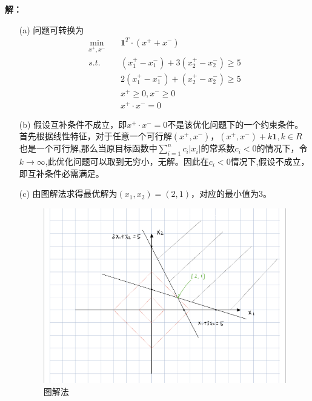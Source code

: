 \documentclass[10pt]{article}
\begin{document}
\begin{enumerate}
	\Large{\textbf{解：}}
	\begin{itemize}
	\item [(a)]问题可转换为
	\begin{equation}
	\begin{aligned}
		\min_{x^+,x^-}\quad &\boldsymbol{1}^T\cdot(x^++x^-)\\
		s.t.\quad            &(x_1^+-x_1^-) + 3(x_2^+-x_2^-) \ge 5\\
							 &2(x_1^+-x_1^-) + (x_2^+-x_2^-) \ge 5\\
							 &x^+\ge0,x^-\ge0\\
							 &x^+\cdot x^-=0
	\end{aligned}
	\end{equation}
	\item [(b)] 假设互补条件不成立，即$x^+\cdot x^-=0$不是该优化问题下的一个约束条件。首先根据线性特征，对于任意一个可行解$(x^+,x^-)$，$(x^+,x^-)+k\boldsymbol{1},k\in R$也是一个可行解,那么当原目标函数中$\sum_{i=1}^n c_i|x_i|$的常系数$c_i<0$的情况下，令$k\rightarrow\infty$,此优化问题可以取到无穷小，无解。因此在$c_i<0$情况下,假设不成立，即互补条件必需满足。
	\item [(c)] 由图解法求得最优解为$(x_1,x_2)=(2,1)$，对应的最小值为3。
	\begin{figure}[!h]
		\centering
		\includegraphics[width=.9\textwidth]{p4.jpeg}
		\caption{图解法}
	\end{figure}
	\end{itemize}
\end{enumerate}
	
\end{document}
